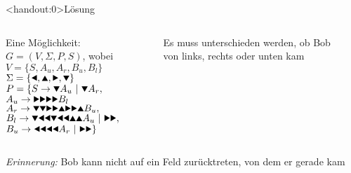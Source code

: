 {
\begin{frame}<handout:0>{Lösung}
  \begin{columns}
    \begin{alertblock}{Eine Möglichkeit:}
      $G = (V, \Sigma, P, S)$, wobei \\
      $V = \{S, A_u, A_r, B_u, B_l\}$ \\
      $\Sigma = \{\text{\Rewind}, \text{\MoveUp}, \text{\Forward}, \text{\MoveDown}\}$ \\
      $P = \{S \rightarrow \text\MoveDown A_u \ |\ \text\MoveDown A_r,$\\
      \qquad\; $A_u \rightarrow \text{\Forward\Forward\Forward\Forward} B_l$\\
      \qquad\; $A_r \rightarrow \text{\MoveDown\MoveDown\Forward\Forward\MoveUp\Forward\Forward\MoveUp} B_u,$\\
      \qquad\; $B_l \rightarrow \text{\MoveDown\Rewind\Rewind\MoveDown\Rewind\Rewind\MoveUp\MoveUp} A_u \ |\ \text{\Forward\Forward},$\\
      \qquad\; $B_u \rightarrow \text{\Rewind\Rewind\Rewind\Rewind} A_r \ |\ \text{\Forward\Forward}\}$
    \end{alertblock}
    \begin{figure}
      \centering
      \def\labyrinthVariant{DecisionPoints}
      \def\labyrinthSize{0.9\textwidth}
      
      \caption{Es muss unterschieden werden, ob Bob von links, rechts oder unten kam}

    \end{figure}
  \end{columns}
  \small\emph{Erinnerung:} Bob kann nicht auf ein Feld zurücktreten, von dem er gerade kam
\end{frame}
}

